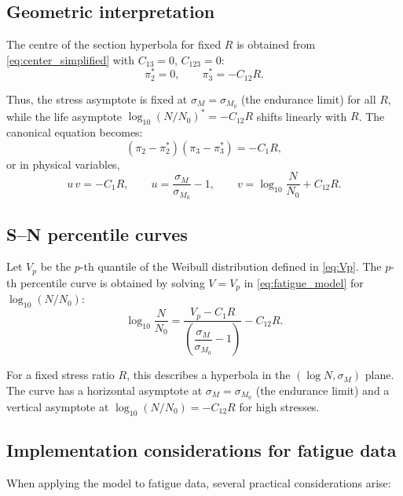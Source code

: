 \subsection{Geometric interpretation}

The centre of the section hyperbola for fixed \(R\) is obtained from \eqref{eq:center_simplified} with \(C_{13}=0\), \(C_{123}=0\):
\[
\pi_2^* = 0,\qquad \pi_3^* = -C_{12}R.
\]

Thus, the stress asymptote is fixed at \(\sigma_M = \sigma_{M_0}\) (the endurance limit) for all \(R\), while the life asymptote \(\log_{10}(N/N_0)^* = -C_{12}R\) shifts linearly with \(R\). The canonical equation becomes:
\[
(\pi_2 - \pi_2^*)(\pi_3 - \pi_3^*) = -C_1 R,
\]
or in physical variables,
\[
u\,v = -C_1 R,\qquad
u = \frac{\sigma_M}{\sigma_{M_0}}-1,\qquad
v = \log_{10}\frac{N}{N_0} + C_{12}R.
\]

\subsection{S–N percentile curves}

Let \(V_p\) be the \(p\)-th quantile of the Weibull distribution defined in \eqref{eq:Vp}. The \(p\)-th percentile curve is obtained by solving \(V = V_p\) in \eqref{eq:fatigue_model} for \(\log_{10}(N/N_0)\):
\begin{equation}\label{eq:SN_percentile_fatigue}
\boxed{
\log_{10}\frac{N}{N_0}
= \frac{V_p - C_1 R}{\left(\dfrac{\sigma_M}{\sigma_{M_0}} - 1\right)} - C_{12}R.
}
\end{equation}

For a fixed stress ratio \(R\), this describes a hyperbola in the \((\log N,\sigma_M)\) plane. The curve has a horizontal asymptote at \(\sigma_M = \sigma_{M_0}\) (the endurance limit) and a vertical asymptote at \(\log_{10}(N/N_0) = -C_{12}R\) for high stresses.

\subsection{Implementation considerations for fatigue data}

When applying the model to fatigue data, several practical considerations arise:

